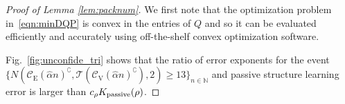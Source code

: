 \documentclass[11pt,onecolumn]{article}
\newcommand{\calT}{\mathcal{T}}
\newcommand{\bbN}{\mathbb{N}}
\newcommand{\scC}{\mathscr{C}}
\newcommand{\halpha}{\hat{\alpha}}
\newcommand{\Passive}{{\rm passive}}
\begin{document}
\begin{proof}[Proof of Lemma \ref{lem:packnum}]
	We first note that the optimization problem in~\eqref{eqn:minDQP} is  convex in the entries of $Q$ and so it can be evaluated efficiently and accurately using off-the-shelf convex optimization software. %
	
	Fig.~\ref{fig:unconfide_tri} shows that the ratio of error exponents for the event $\{N(\scC_{\mathrm{E}}(\halpha n)^{\complement},\calT(\scC_{\mathrm{V}}(\halpha n)^{\complement}),2)\geq 13\}_{n\in\bbN}$ and passive structure learning error is larger than $c_{\rho}K _{\Passive}(\rho)$.
\end{proof}
\end{document}
